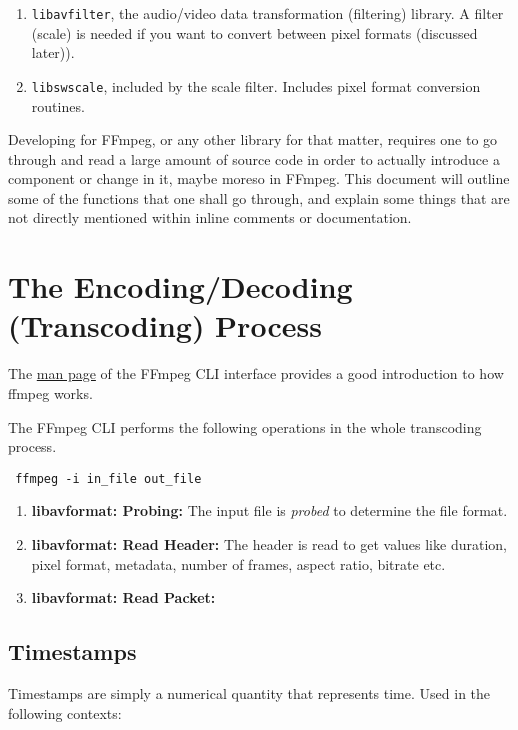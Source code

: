 \documentclass{article}
\begin{document}
\begin{enumerate}
\item \texttt{libavfilter}, the audio/video data transformation (filtering) 
      library. A filter (scale) is needed if you want to convert between pixel 
      formats (discussed later)).
\item \texttt{libswscale}, included by the scale filter. Includes pixel format 
      conversion routines.
\end{enumerate}

Developing for FFmpeg, or any other library for that matter, requires one to go
through and read a large amount of source code in order to actually introduce a
component or change in it, maybe moreso in FFmpeg. This document will outline
some of the functions that one shall go through, and explain some things that
are not directly mentioned within inline comments or documentation.

\section{The Encoding/Decoding (Transcoding) Process}



The \href{https://ffmpeg.org/ffmpeg.html\#toc-Detailed-description}{man page} 
of the FFmpeg CLI interface provides a good introduction to how ffmpeg works.

The FFmpeg CLI performs the following operations in the whole transcoding process.

\texttt{ ffmpeg -i in\_file out\_file }

\begin{enumerate}
\item \textbf{libavformat: Probing:} The input file is \emph{probed} to 
      determine the file format.
\item \textbf{libavformat: Read Header:} The header is read to get values like 
      duration, pixel format, metadata, number of frames, aspect ratio, bitrate 
      etc.
\item \textbf{libavformat: Read Packet:} 
\end{enumerate}

\subsection{Timestamps}

Timestamps are simply a numerical quantity that represents time. Used in the
following contexts:
\end{document}
